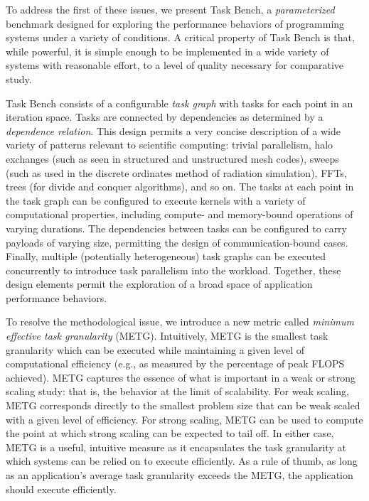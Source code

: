 To address the first of these issues, we present Task Bench, a
\emph{parameterized} benchmark designed for exploring the performance
behaviors of programming systems under a variety of conditions. A
critical property of Task Bench is that, while powerful, it is simple
enough to be implemented in a wide variety of systems with reasonable
effort, to a level of quality necessary for comparative study.

Task Bench consists of a configurable \emph{task graph} with tasks for
each point in an iteration space. Tasks are connected by dependencies
as determined by a \emph{dependence relation}. This design permits a
very concise description of a wide variety of patterns relevant to
scientific computing: trivial parallelism, halo exchanges (such as
seen in structured and unstructured mesh codes), sweeps (such as used
in the discrete ordinates method of radiation simulation), FFTs, trees
(for divide and conquer algorithms), and so on. The tasks at each
point in the task graph can be configured to execute kernels with a
variety of computational properties, including compute- and
memory-bound operations of varying durations. The dependencies between
tasks can be configured to carry payloads of varying size, permitting
the design of communication-bound cases. Finally, multiple
(potentially heterogeneous) task graphs can be executed concurrently
to introduce task parallelism into the workload. Together, these
design elements permit the exploration of a broad space of application
performance behaviors.

To resolve the methodological issue, we introduce a new metric called
\emph{minimum effective task granularity} (METG). Intuitively, METG is
the smallest task granularity which can be executed while maintaining
a given level of computational efficiency (e.g., as measured by the
percentage of peak FLOPS achieved). METG captures the essence of what
is important in a weak or strong scaling study: that is, the behavior
at the limit of scalability. For weak scaling, METG corresponds
directly to the smallest problem size that can be weak scaled with a
given level of efficiency. For strong scaling, METG can be used to
compute the point at which strong scaling can be expected to tail
off. In either case, METG is a useful, intuitive measure as it
encapsulates the task granularity at which systems can be relied on to
execute efficiently. As a rule of thumb, as long as an application's
average task granularity exceeds the METG, the application should
execute efficiently.

